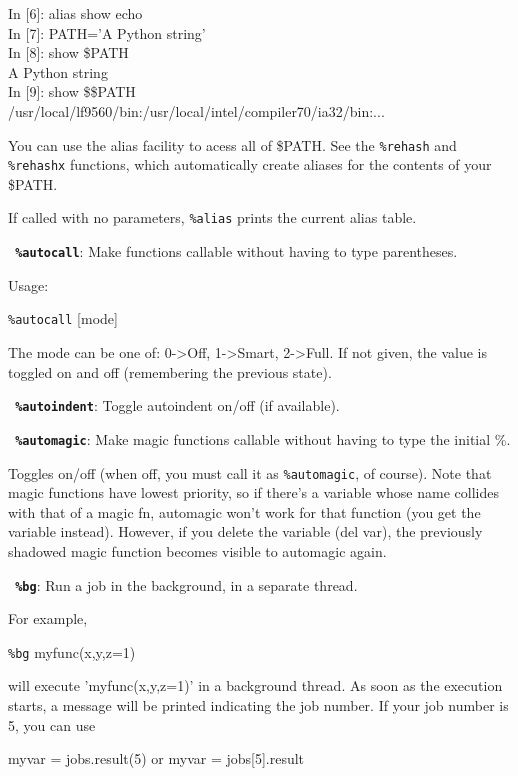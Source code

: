         In [6]: alias show echo\\
        In [7]: PATH='A Python string'\\
        In [8]: show \$PATH\\
        A Python string\\
        In [9]: show \$\$PATH\\
        /usr/local/lf9560/bin:/usr/local/intel/compiler70/ia32/bin:...

        You can use the alias facility to acess all of \$PATH.  See the \texttt{\%rehash}
        and \texttt{\%rehashx} functions, which automatically create aliases for the
        contents of your \$PATH.

        If called with no parameters, \texttt{\%alias} prints the current alias table.

\bigskip
\texttt{\textbf{ \%autocall}}:
	Make functions callable without having to type parentheses.

        Usage:

           \texttt{\%autocall} [mode]

        The mode can be one of: 0->Off, 1->Smart, 2->Full.  If not given, the
        value is toggled on and off (remembering the previous state).

\bigskip
\texttt{\textbf{ \%autoindent}}:
	Toggle autoindent on/off (if available).

\bigskip
\texttt{\textbf{ \%automagic}}:
	Make magic functions callable without having to type the initial \%.
        
        Toggles on/off (when off, you must call it as \texttt{\%automagic}, of
        course). Note that magic functions have lowest priority, so if there's
        a variable whose name collides with that of a magic fn, automagic
        won't work for that function (you get the variable instead). However,
        if you delete the variable (del var), the previously shadowed magic
        function becomes visible to automagic again.

\bigskip
\texttt{\textbf{ \%bg}}:
	Run a job in the background, in a separate thread.

        For example,

          \texttt{\%bg} myfunc(x,y,z=1)

        will execute 'myfunc(x,y,z=1)' in a background thread.  As soon as the
        execution starts, a message will be printed indicating the job
        number.  If your job number is 5, you can use

          myvar = jobs.result(5)  or  myvar = jobs[5].result

